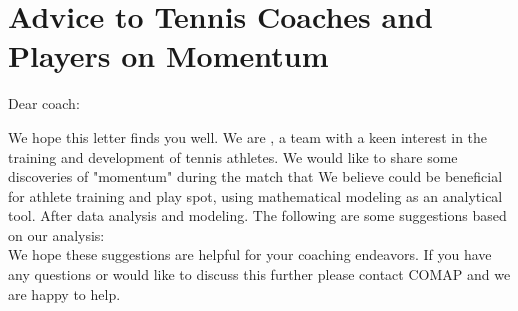 \section{Advice to Tennis Coaches and Players on Momentum}

Dear coach:

We hope this letter finds you well. We are , a team with a keen interest in the training and development of tennis 
athletes. We would like to share some discoveries of "momentum" during the match that We believe could be beneficial 
for athlete training and play spot, using mathematical modeling as an analytical tool. After data analysis and modeling. 
The following are some suggestions based on our analysis:\\


We hope these suggestions are helpful for your coaching endeavors. 
If you have any questions or would like to discuss this further please contact
COMAP and we are happy to help.